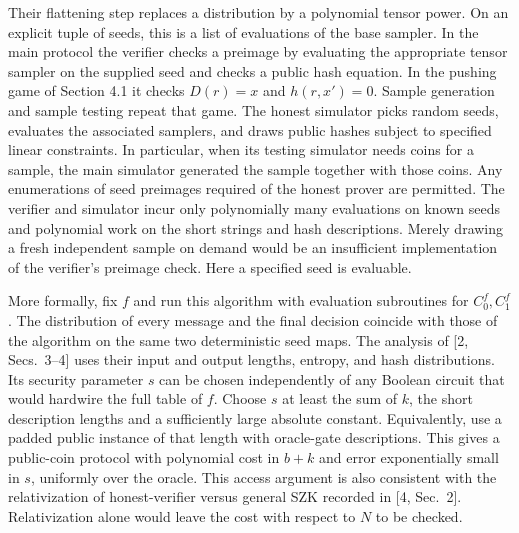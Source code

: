 \documentclass[11pt]{article}
\begin{document}
Their flattening step replaces a distribution by a polynomial tensor power. On an explicit tuple of seeds, this is a list of evaluations of the base sampler. In the main protocol the verifier checks a preimage by evaluating the appropriate tensor sampler on the supplied seed and checks a public hash equation. In the pushing game of Section 4.1 it checks $D(r)=x$ and $h(r,x')=0$. Sample generation and sample testing repeat that game. The honest simulator picks random seeds, evaluates the associated samplers, and draws public hashes subject to specified linear constraints. In particular, when its testing simulator needs coins for a sample, the main simulator generated the sample together with those coins. Any enumerations of seed preimages required of the honest prover are permitted. The verifier and simulator incur only polynomially many evaluations on known seeds and polynomial work on the short strings and hash descriptions. Merely drawing a fresh independent sample on demand would be an insufficient implementation of the verifier's preimage check. Here a specified seed is evaluable.

More formally, fix $f$ and run this algorithm with evaluation subroutines for $C_0^f,C_1^f$. The distribution of every message and the final decision coincide with those of the algorithm on the same two deterministic seed maps. The analysis of [2, Secs.~3--4] uses their input and output lengths, entropy, and hash distributions. Its security parameter $s$ can be chosen independently of any Boolean circuit that would hardwire the full table of $f$. Choose $s$ at least the sum of $k$, the short description lengths and a sufficiently large absolute constant. Equivalently, use a padded public instance of that length with oracle-gate descriptions. This gives a public-coin protocol with polynomial cost in $b+k$ and error exponentially small in $s$, uniformly over the oracle. This access argument is also consistent with the relativization of honest-verifier versus general SZK recorded in [4, Sec.~2]. Relativization alone would leave the cost with respect to $N$ to be checked.
\end{document}
